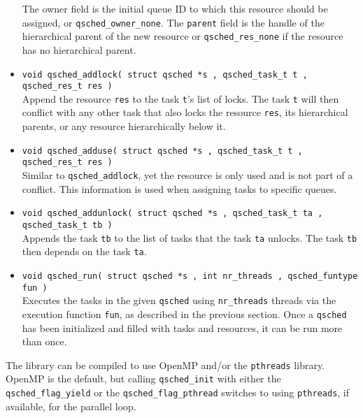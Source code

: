\documentclass[preprint]{elsarticle}
\begin{document}
\begin{itemize}
        The owner field is the initial queue ID to which this resource
        should be assigned, or {\tt qsched\_owner\_none}.
        The {\tt parent} field is the handle of the hierarchical parent of
        the new resource or {\tt qsched\_res\_none} if the resource
        has no hierarchical parent.
        \vspace{1mm}
    \item {\tt void qsched\_addlock( struct qsched *s , qsched\_task\_t t , qsched\_res\_t res )} \\
        Append the resource {\tt res} to the task {\tt t}'s list of
        locks.
        The task {\tt t} will then conflict with any other task that
        also locks the resource {\tt res}, its hierarchical parents, or
        any resource hierarchically below it.
        \vspace{1mm}
    \item {\tt void qsched\_adduse( struct qsched *s , qsched\_task\_t t , qsched\_res\_t res )} \\
        Similar to {\tt qsched\_addlock}, yet the resource is only used and
        is not part of a conflict.
        This information is used when assigning tasks to specific queues.
        \vspace{1mm}
    \item {\tt void qsched\_addunlock( struct qsched *s , qsched\_task\_t ta , qsched\_task\_t tb )} \\
        Appends the task {\tt tb} to the list of tasks that the task {\tt ta}
        unlocks.
        The task {\tt tb} then depends on the task {\tt ta}.
        \vspace{1mm}
    \item {\tt void qsched\_run( struct qsched *s , int nr\_threads , qsched\_funtype fun )} \\
        Executes the tasks in the given {\tt qsched} using {\tt nr\_threads}
        threads via the execution function {\tt fun}, as described in the
        previous section.
        Once a {\tt qsched} has been initialized and filled with
        tasks and resources, it can be run more than once.
        \vspace{1mm}
\end{itemize}

The library can be compiled to use OpenMP and/or the
{\tt pthreads} library.
OpenMP is the default, but calling {\tt qsched\_init} with
either the {\tt qsched\_flag\_yield}
or the {\tt qsched\_flag\_pthread} switches to using {\tt pthreads},
if available, for the parallel loop.
\end{document}
